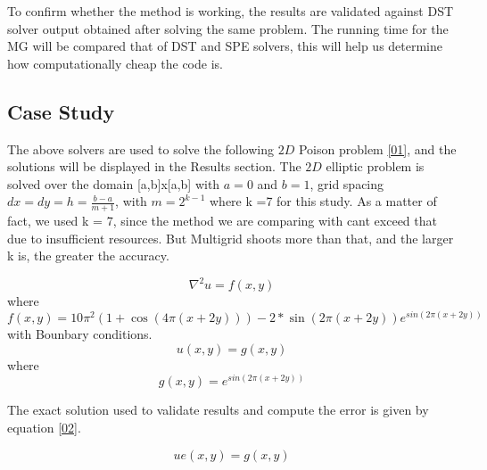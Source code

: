 \documentclass[12pt,a4paper]{article}
\begin{document}
	\noindent To confirm whether the method is working, the results are validated against DST solver output  obtained after  solving the same problem.  The running time for the MG will be compared that of DST and SPE solvers, this will help us determine how computationally cheap the code is.
	
	
		\subsection*{Case Study}
	The above solvers are used to solve the following $2D$ Poison  problem \eqref{01}, and the solutions will be displayed in the Results section.  The $2D$ elliptic problem is solved over the domain [a,b]x[a,b] with $a=0$ and $b=1$, grid spacing $dx=dy=h=\frac{b-a}{m+1}$, with $m=2^{k-1}$ where k =7 for this study. As a matter of fact, we used k = 7, since the method we are comparing with cant exceed that due to insufficient resources. But  Multigrid shoots more than that, and the larger k is, the greater the accuracy.
	
	\begin{equation}
		\nabla ^{2} u = f(x,y)
		\label{01}
	\end{equation}
	where 
	$$f(x,y) = 10\pi^{2} (1+ \cos(4\pi(x+2y))) -2*\sin(2\pi(x+2y)) e^{sin(2\pi(x+2y))} $$
	with Bounbary conditions.
	$$u(x,y) = g(x,y) $$
	where 
	$$g(x,y) = e^{sin(2\pi(x+2y))} $$
	
	The exact solution used to validate results and compute the error is given by equation \eqref{02}.
	
	\begin{equation}
		ue(x,y) = g(x,y)
		\label{02}
	\end{equation}
	

	
	
	
\end{document}
